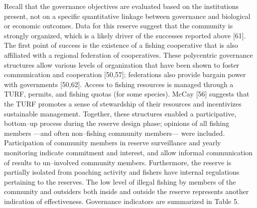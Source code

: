 \documentclass[12pt,]{article}
\begin{document}
Recall that the governance objectives are evaluated based on the
institutions present, not on a specific quantitative linkage between
governance and biological or economic outcomes. Data for this reserve
suggest that the community is strongly organized, which is a likely
driver of the successes reported above {[}61{]}. The first point of
success is the existence of a fishing cooperative that is also
affiliated with a regional federation of cooperatives. These polycentric
governance structures allow various levels of organization that have
been shown to foster communication and cooperation {[}50,57{]};
federations also provide bargain power with governments {[}50,62{]}.
Access to fishing resources is managed through a TURF, permits, and
fishing quotas (for some species). McCay {[}56{]} suggests that the TURF
promotes a sense of stewardship of their resources and incentivizes
sustainable management. Together, these structures enabled a
participative, bottom--up process during the reserve design phase;
opinions of all fishing members ---and often non--fishing community
members--- were included. Participation of community members in reserve
surveillance and yearly monitoring indicate commitment and interest, and
allow informal communication of results to un--involved community
members. Furthermore, the reserve is partially isolated from poaching
activity and fishers have internal regulations pertaining to the
reserves. The low level of illegal fishing by members of the community
and outsiders both inside and outside the reserve represents another
indication of effectiveness. Governance indicators are summarized in
Table 5.
\end{document}
